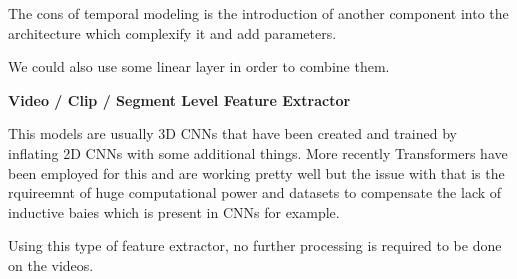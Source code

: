 The cons of temporal modeling is the introduction of another component into the architecture which complexify it and add parameters.

We could also use some linear layer in order to combine them.


\textbf{Video / Clip / Segment Level Feature Extractor}

This models are usually 3D CNNs that have been created and trained by inflating 2D CNNs with some additional things. More recently Transformers have been employed for this and are working pretty well but the issue with that is the rquireemnt of huge computational power and datasets to compensate the lack of inductive baies which is present in CNNs for example.

Using this type of feature extractor, no further processing is required to be done on the videos.